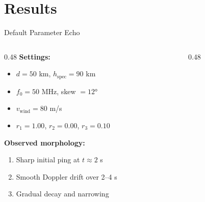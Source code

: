 \documentclass[aspectratio=169,11pt]{beamer}
\begin{document}
\section{Results}
\begin{frame}{Default Parameter Echo}
\begin{columns}
\begin{column}{0.48\textwidth}
\textbf{Settings:}
\begin{itemize}
    \item $d = 50$ km, $h_{\mathrm{spec}} = 90$ km
    \item $f_0 = 50$ MHz, skew $= 12°$
    \item $v_{\mathrm{wind}} = 80$ m/s
    \item $r_1 = 1.00$, $r_2 = 0.00$, $r_3 = 0.10$
\end{itemize}
\vspace{0.3em}
\textbf{Observed morphology:}
\begin{enumerate}
    \item Sharp initial ping at $t \approx 2$ s
    \item Smooth Doppler drift over 2--4 s
    \item Gradual decay and narrowing
\end{enumerate}
\end{column}
\begin{column}{0.48\textwidth}
\end{column}
\end{columns}
\end{frame}
\end{document}

